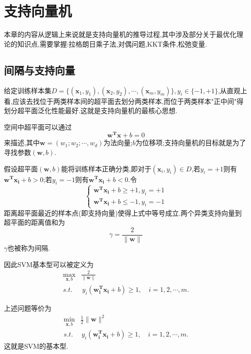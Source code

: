 \chapter{支持向量机}

本章的内容从逻辑上来说就是支持向量机的推导过程,其中涉及部分关于最优化理论的知识点,需要掌握:拉格朗日乘子法,对偶问题,KKT条件,松弛变量.

\section{间隔与支持向量}

给定训练样本集$D=\{(\mathbf x_1, y_1),(\mathbf x_2, y_2),\cdots,(\mathbf x_m, y_m)\},y_i\in\{-1,+1\}$,从直观上看,应该去找位于两类样本间的超平面去划分两类样本,而位于两类样本"正中间"得划分超平面泛化性能最好.这就是支持向量机的最核心思想.

空间中超平面可以通过
\begin{equation}
\mathbf {w^Tx}+b=0
\end{equation}
来描述,其中$\mathbf w=(w_1;w_2;\cdots,w_d)$为法向量;$b$为位移项;支持向量机的目标就是为了寻找参数$(\mathbf w,b)$.

假设超平面$(\mathbf w,b)$能将训练样本正确分类,即对于$(\mathbf x_i,y_i)\in D$,若$y_i=+1$则有$\mathbf {w^Tx_i}+b>0$;若$y_i=-1$则有$\mathbf{w^Tx_i}+b<0$.令
\begin{equation}
\left\{
\begin{array}{ll}
\mathbf{w^Tx_i}+b\ge +1,y_i=+1 \\
\mathbf{w^Tx_i}+b\le -1,y_i=-1
\end{array}
\right.
\end{equation}
距离超平面最近的样本点(即支持向量)使得上式中等号成立.两个异类支持向量到超平面的距离值和为
\begin{equation}
\gamma=\frac{2}{\|\mathbf w\|}
\end{equation}
$\gamma$也被称为间隔.

因此SVM基本型可以被定义为
\begin{equation}\begin{split}
\max_{\mathbf x,b}&\frac{2}{\|\mathbf w\|} \\
s.t.& \,y_i(\mathbf{w_i^Tx_i}+b)\ge 1,\quad i=1,2,\cdots,m.
\end{split}\end{equation}

上述问题等价为
\begin{equation}\begin{split}
\min_{\mathbf x,b}&\frac{1}{2}\|\mathbf w\|^2 \\
s.t.& \,y_i(\mathbf{w_i^Tx_i}+b)\ge 1,\quad i=1,2,\cdots,m.
\end{split}\end{equation}
这就是SVM的基本型.

